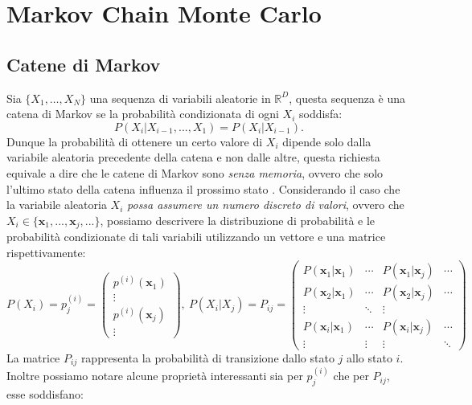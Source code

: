 \section{Markov Chain Monte Carlo}
\label{sec:mcmc}
\subsection{Catene di Markov}

Sia $\{X_1,\dots, X_N\}$ una sequenza di variabili aleatorie in $\mathbb{R}^D$, questa sequenza è una catena di Markov se la probabilità condizionata di ogni $X_i$ soddisfa:
\begin{equation}
    \label{eq:markov}
P(X_i |X_{i-1},..., X_{1}) = P(X_i | X_{i-1}).
\end{equation} Dunque la probabilità di ottenere un certo valore di $X_i$ dipende solo dalla variabile aleatoria precedente della catena e non dalle altre, questa richiesta equivale a dire che le catene di Markov sono \textit{senza memoria}, ovvero che solo l'ultimo stato della catena influenza il prossimo stato \cite{gubernatis2016quantum}. 
Considerando il caso che la variabile aleatoria $X_i$ \emph{possa assumere un numero discreto di valori}, ovvero che $X_i \in \{\mathbf{x}_1, ..., \mathbf{x}_j, ...\}$, possiamo descrivere la distribuzione di probabilità e le probabilità condizionate di tali variabili utilizzando un vettore e una matrice rispettivamente:
\begin{equation}
P(X_i) = p^{(i)}_j = \begin{pmatrix} p^{(i)}(\mathbf{x}_1) \\ \vdots \\ p^{(i)}(\mathbf{x}_j) \\ \vdots \end{pmatrix}, 
\ 
P(X_i|X_j) = P_{ij} = 
\begin{pmatrix}
P(\mathbf{x}_1|\mathbf{x}_1)  & \cdots & P(\mathbf{x}_1|\mathbf{x}_j) & \cdots \\
P(\mathbf{x}_2|\mathbf{x}_1) & \cdots & P(\mathbf{x}_2|\mathbf{x}_j) & \cdots \\
\vdots & \ddots & \vdots & \\
P(\mathbf{x}_i|\mathbf{x}_1) & \cdots & P(\mathbf{x}_i|\mathbf{x}_j) & \cdots \\
\vdots   & \vdots& \vdots & \ddots
\end{pmatrix}
\end{equation} La matrice $P_{ij}$ rappresenta la probabilità di transizione dallo stato $j$ allo stato $i$. Inoltre possiamo notare alcune proprietà interessanti sia per $p^{(i)}_j$ che per $P_{ij}$, esse soddisfano:
